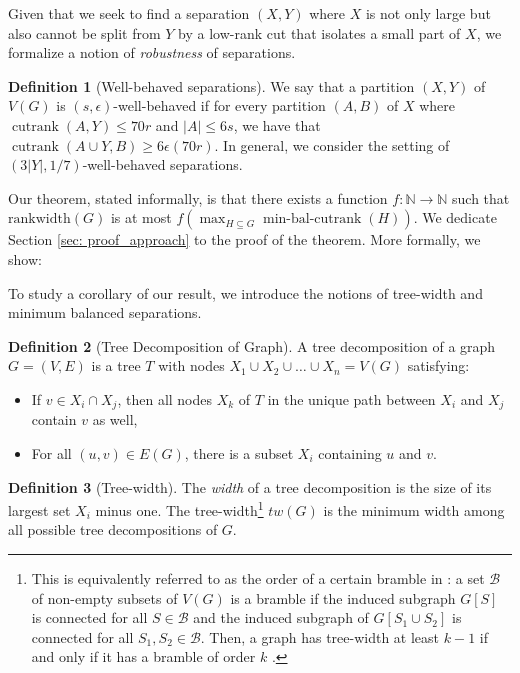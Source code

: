 \documentclass{article}
\theoremstyle{definition}
\newtheorem{definition}{Definition}[section]
\begin{document}
 Given that we seek to find a separation $(X,Y)$ where $X$ is not only large but also cannot be split from $Y$ by a low-rank cut that isolates a small part of $X$, we formalize a notion of \emph{robustness} of separations.

\begin{definition}[Well-behaved separations] We say that a partition $(X,Y)$ of $V(G)$ is $(s,\epsilon)$-well-behaved if for every partition $(A,B)$ of $X$ where $\operatorname{cutrank}(A, Y) \leq 70r$ and $|A| \leq 6s$, we have that $\operatorname{cutrank}(A \cup Y,B) \geq 6\epsilon (70r)$. In general, we consider the setting of $(3|Y|, 1/7)$-well-behaved separations. \label{def: well-behaved separations}
\end{definition}


Our theorem, stated informally, is that there exists a function $f:\mathbb{N}\to\mathbb{N}$ such that $\mathrm{rankwidth}(G)$ is at most $f(\max_{H\subseteq G}  \operatorname{min-bal-cutrank}(H))$.
\noindent We dedicate Section \ref{sec: proof_approach} to the proof of the theorem. More formally, we show:
\MainThm*

To study a corollary of our result, we introduce the notions of tree-width and minimum balanced separations.

\begin{definition}[Tree Decomposition of Graph]
    A tree decomposition of a graph $G=(V,E)$ is a tree $T$ with nodes $X_1 \cup X_2 \cup \dots \cup X_n = V(G)$ satisfying:
    \begin{itemize}
        \item If $v\in X_i \cap X_j$, then all nodes $X_k$ of $T$ in the unique path between $X_i$ and $X_j$ contain $v$ as well,
        \item For all $(u,v)\in E(G)$, there is a subset $X_i$ containing $u$ and $v$.
    \end{itemize}
\end{definition}

\begin{definition}[Tree-width]
    The \emph{width} of a tree decomposition is the size of its largest set $X_i$ minus one. The tree-width\footnote{This is equivalently referred to as the order of a certain bramble in \cite{Dvorak_Norin_2018}: a set $\mathcal{B}$ of non-empty subsets of $V(G)$ is a bramble if the induced subgraph $G[S]$ is connected for all $S\in \mathcal{B}$ and the induced subgraph of $G[S_1\cup S_2]$ is connected for all $S_1,S_2\in \mathcal{B}$. Then, a graph has tree-width at least $k-1$ if and only if it has a bramble of order $k$ \cite{Dvorak_Norin_2018}.} $tw(G)$ is the minimum width among all possible tree decompositions of $G$.
\end{definition}
\end{document}
